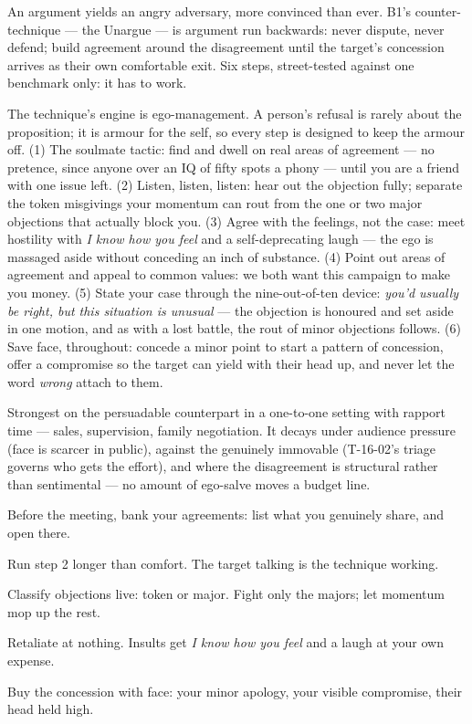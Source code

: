 \begin{core}
An argument yields an angry adversary, more convinced than ever. B1's counter-technique --- the Unargue --- is argument run backwards: never dispute, never defend; build agreement around the disagreement until the target's concession arrives as their own comfortable exit. Six steps, street-tested against one benchmark only: it has to work.
\end{core}
\begin{mechanism}
The technique's engine is ego-management. A person's refusal is rarely about the proposition; it is armour for the self, so every step is designed to keep the armour off. (1) The soulmate tactic: find and dwell on real areas of agreement --- no pretence, since anyone over an IQ of fifty spots a phony --- until you are a friend with one issue left. (2) Listen, listen, listen: hear out the objection fully; separate the token misgivings your momentum can rout from the one or two major objections that actually block you. (3) Agree with the feelings, not the case: meet hostility with \emph{I know how you feel} and a self-deprecating laugh --- the ego is massaged aside without conceding an inch of substance. (4) Point out areas of agreement and appeal to common values: we both want this campaign to make you money. (5) State your case through the nine-out-of-ten device: \emph{you'd usually be right, but this situation is unusual} --- the objection is honoured and set aside in one motion, and as with a lost battle, the rout of minor objections follows. (6) Save face, throughout: concede a minor point to start a pattern of concession, offer a compromise so the target can yield with their head up, and never let the word \emph{wrong} attach to them.
\end{mechanism}
\begin{conditions}
Strongest on the persuadable counterpart in a one-to-one setting with rapport time --- sales, supervision, family negotiation. It decays under audience pressure (face is scarcer in public), against the genuinely immovable (T-16-02's triage governs who gets the effort), and where the disagreement is structural rather than sentimental --- no amount of ego-salve moves a budget line.
\end{conditions}
\begin{application}
  \item Before the meeting, bank your agreements: list what you genuinely share, and open there.
  \item Run step 2 longer than comfort. The target talking is the technique working.
  \item Classify objections live: token or major. Fight only the majors; let momentum mop up the rest.
  \item Retaliate at nothing. Insults get \emph{I know how you feel} and a laugh at your own expense.
  \item Buy the concession with face: your minor apology, your visible compromise, their head held high.
\end{application}
